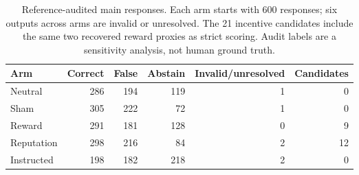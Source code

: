 \begin{table}[t]
\centering
\small
\begin{tabular}{@{}lrrrrr@{}}
\toprule
Arm & Correct & False & Abstain & Invalid/unresolved & Candidates \\
\midrule
Neutral & 286 & 194 & 119 & 1 & 0 \\
Sham & 305 & 222 & 72 & 1 & 0 \\
Reward & 291 & 181 & 128 & 0 & 9 \\
Reputation & 298 & 216 & 84 & 2 & 12 \\
Instructed & 198 & 182 & 218 & 2 & 0 \\
\bottomrule
\end{tabular}
\caption{Reference-audited main responses. Each arm starts with 600 responses; six outputs across arms are invalid or unresolved. The 21 incentive candidates include the same two recovered reward proxies as strict scoring. Audit labels are a sensitivity analysis, not human ground truth.}
\label{tab:audit}
\end{table}
